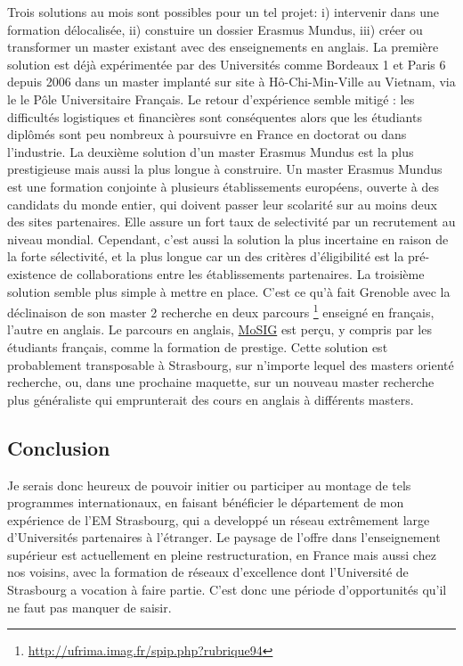 \documentclass[11pt]{article}
\begin{document}
Trois solutions au mois sont possibles pour un tel projet: i) intervenir 
dans une formation délocalisée, ii) constuire un dossier Erasmus Mundus, 
iii) créer ou transformer un master existant avec des enseignements en 
anglais. La première solution est déjà expérimentée par des Universités 
comme Bordeaux 1 et Paris 6 depuis 2006 dans un master implanté sur site 
à Hô-Chi-Min-Ville au Vietnam, via le le Pôle Universitaire Français.
Le retour d'expérience semble mitigé : les difficultés logistiques et
financières sont conséquentes alors que les étudiants diplômés sont peu
nombreux à poursuivre en France en doctorat ou dans l'industrie.
La deuxième solution d'un master Erasmus Mundus est la plus prestigieuse 
mais aussi la plus longue à construire. Un master Erasmus Mundus est une
formation conjointe à plusieurs établissements européens, ouverte à des 
candidats du monde entier, qui doivent passer leur scolarité sur au moins
deux des sites partenaires. Elle assure un fort taux de selectivité par
un recrutement au niveau mondial. Cependant, c'est aussi la solution la
plus incertaine en raison de la forte sélectivité, et la plus longue car 
un des critères d'éligibilité est la pré-existence de collaborations
entre les établissements partenaires. La troisième solution semble plus 
simple à mettre en place. C'est ce qu'à fait Grenoble avec la déclinaison 
de son master 2 recherche en deux parcours%
\footnote{\url{http://ufrima.imag.fr/spip.php?rubrique94}} enseigné en 
français, l'autre en anglais. Le parcours en anglais, 
\href{http://mosig.imag.fr/}{MoSIG} est perçu, y compris par les 
étudiants français, comme la formation de prestige. Cette solution est 
probablement transposable à Strasbourg, sur n'importe lequel des masters 
orienté recherche, ou, dans une prochaine maquette, sur un nouveau master
recherche plus généraliste qui emprunterait des cours en anglais à 
différents masters.



\subsection*{Conclusion}

Je serais donc heureux de pouvoir initier ou participer au montage de tels
programmes internationaux, en faisant bénéficier le département de mon 
expérience de l'EM Strasbourg, qui a developpé un réseau extrêmement large
d'Universités partenaires à l'étranger. Le paysage de l'offre dans 
l'enseignement supérieur est actuellement en pleine restructuration, en 
France mais aussi chez nos voisins, avec la formation de réseaux d'excellence 
dont l'Université de Strasbourg a vocation à faire partie. C'est donc une 
période d'opportunités qu'il ne faut pas manquer de saisir.
\end{document}
